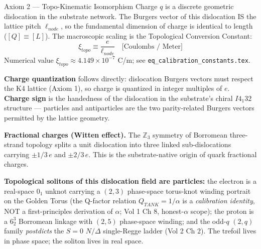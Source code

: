 %
%
\begin{resultbox}{Axiom 2 — Topo-Kinematic Isomorphism}
Charge $q$ is a discrete geometric dislocation in the substrate network. The Burgers vector of this dislocation IS the lattice pitch $\ell_{node}$, so the fundamental dimension of charge is identical to length ($[Q] \equiv [L]$). The macroscopic scaling is the Topological Conversion Constant:
\begin{equation}
    \xi_{topo} \equiv \frac{e}{\ell_{node}} \quad \text{[Coulombs / Meter]}
    \label{eq:axiom2_xi_topo}
\end{equation}
Numerical value $\xi_{topo} \approx 4.149 \times 10^{-7}$ C/m; see \texttt{eq\_calibration\_constants.tex}.

\medskip\noindent
\textbf{Charge quantization} follows directly: dislocation Burgers vectors must respect the K4 lattice (Axiom 1), so charge is quantized in integer multiples of $e$. \textbf{Charge sign} is the handedness of the dislocation in the substrate's chiral $I4_1 32$ structure --- particles and antiparticles are the two parity-related Burgers vectors permitted by the lattice geometry.

\medskip\noindent
\textbf{Fractional charges (Witten effect).} The $\mathbb{Z}_3$ symmetry of Borromean three-strand topology splits a unit dislocation into three linked sub-dislocations carrying $\pm 1/3\, e$ and $\pm 2/3\, e$. This is the substrate-native origin of quark fractional charges.

\medskip\noindent
\textbf{Topological solitons of this dislocation field are particles:} the electron is a real-space $0_1$ unknot carrying a $(2,3)$ phase-space torus-knot winding portrait on the Golden Torus (the Q-factor relation $Q_{TANK} = 1/\alpha$ is a \emph{calibration identity}, NOT a first-principles derivation of $\alpha$; Vol 1 Ch 8, honest-$\alpha$ scope); the proton is a $6^3_2$ Borromean linkage with $(2,5)$ phase-space winding; and the odd-$q$ $(2,q)$ family \emph{postdicts} the $S=0$ $N/\Delta$ single-Regge ladder (Vol 2 Ch 2). The trefoil lives in phase space; the soliton lives in real space.


\end{resultbox}

